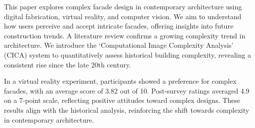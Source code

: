 
This paper explores complex facade design in contemporary architecture using digital fabrication, virtual reality, and computer vision.
We aim to understand how users perceive and accept intricate facades, offering insights into future construction trends.
A literature review confirms a growing complexity trend in architecture.
We introduce the `Computational Image Complexity Analysis' (CICA) system to quantitatively assess historical building complexity, revealing a consistent rise since the late 20th century.

In a virtual reality experiment, participants showed a preference for complex facades, with an average score of 3.82 out of 10.
Post-survey ratings averaged 4.9 on a 7-point scale, reflecting positive attitudes toward complex designs.
These results align with the historical analysis, reinforcing the shift towards complexity in contemporary architecture.

